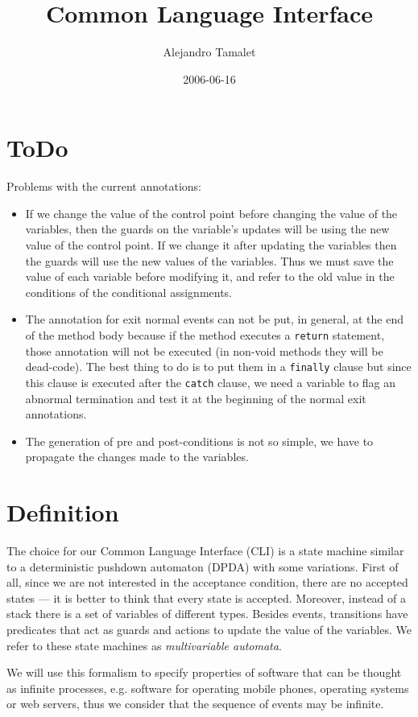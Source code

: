\documentclass[a4paper,10pt]{article}
\author{Alejandro Tamalet}
\date{2006-06-16}
\title{Common Language Interface}
\theoremstyle{definition}
\begin{document}
\maketitle

\section{ToDo}
Problems with the current annotations:
\begin{itemize}
  \item If we change the value of the control point before changing the value of the variables, then the
guards on the variable's updates will be using the new value of the control point. If we change it after
updating the variables then the guards will use the new values of the variables.
  Thus we must save the value of each variable before modifying it, and refer to the old value in the
conditions of the conditional assignments.
  \item The annotation for exit normal events can not be put, in general, at the end of the method body
because if the method executes a \texttt{return} statement, those annotation will not be executed (in non-void
methods they will be dead-code). The best thing to do is to put them in a \texttt{finally} clause but since
this clause is executed after the \texttt{catch} clause, we need a variable to flag an abnormal termination
and test it at the beginning of the normal exit annotations.
  \item The generation of pre and post-conditions is not so simple, we have to propagate the changes made to
the variables.
\end{itemize}


\section{Definition}\label{sec:Definition}
The choice for our Common Language Interface (CLI) is a state machine similar to a deterministic pushdown
automaton (DPDA) with some variations. First of all, since we are not interested in the acceptance condition,
there are no accepted states --- it is better to think that every state is accepted. Moreover, instead of a
stack there is a set of variables of different types. Besides events, transitions have predicates that act as
guards and actions to update the value of the variables.
We refer to these state machines as \textit{multivariable automata}.

We will use this formalism to specify properties of software that can be thought as infinite processes, e.g.
software for operating mobile phones, operating systems or web servers, thus we consider that the sequence of
events may be infinite.
\end{document}
